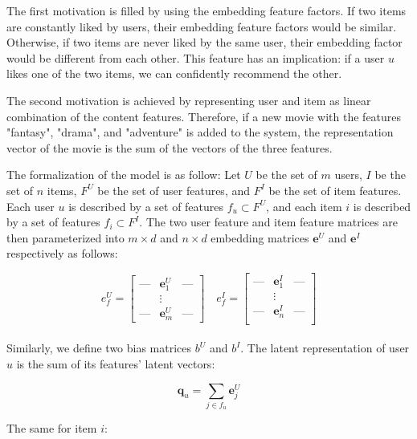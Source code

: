 \noindent The first motivation is filled by using the embedding feature factors. If two items are constantly liked by users, their embedding feature factors would be similar. Otherwise, if two items are never liked by the same user, their embedding factor would be different from each other. This feature has an implication: if a user \(u\) likes one of the two items, we can confidently recommend the other.

\noindent The second motivation is achieved by representing user and item as linear combination of the content features. Therefore, if a new movie with the features "fantasy", "drama", and "adventure" is added to the system, the representation vector of the movie is the sum of the vectors of the three features. 

\noindent The formalization of the model is as follow:
Let \(U\) be the set of \(m\) users, \(I\) be the set of \(n\)  items, \(F^U\) be the set of user features, and \(F^I\) be the set of item features. Each user \(u\) is described by a set of features \(f_u \subset F^U\), and each item \(i\) is described by a set of features \(f_i \subset F^I\). The two user feature and item feature matrices are then parameterized into \(m \times d\) and \(n \times d\) embedding matrices \(\boldsymbol{e}^U\) and \(\boldsymbol{e}^I\) respectively as follows:

\[
e_f^U = \begin{bmatrix}
\mbox{---} & \boldsymbol{e}_1^U & \mbox{---} \\
 & \vdots & \\ 
\mbox{---} & \boldsymbol{e}_m^U & \mbox{---}
\end{bmatrix} \quad
e_f^I = 
\begin{bmatrix}
\mbox{---} & \boldsymbol{e}_1^I & \mbox{---} \\
 & \vdots &  \\ 
\mbox{---}& \boldsymbol{e}_n^I& \mbox{---}\\
\end{bmatrix}
\]
\\


\noindent Similarly, we define two bias matrices \(b^U\) and \(b^I\). The latent representation of user \(u\) is the sum of its features' latent vectors:

\begin{displaymath}
\boldsymbol{q}_u = \sum_{j \in f_u} \boldsymbol{e}_j^U
\end{displaymath}

\noindent The same for item \(i\):

